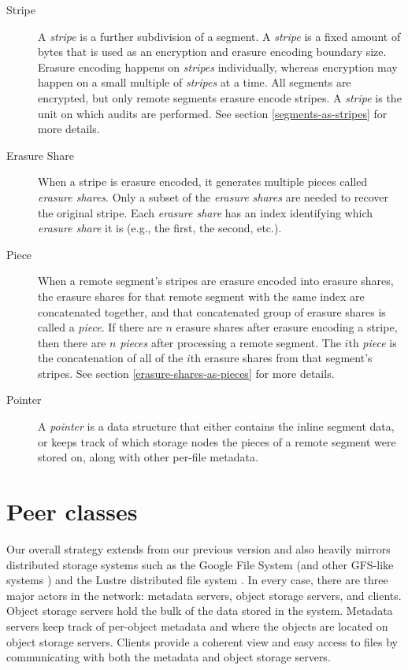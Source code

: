 \documentclass[8pt,fleqn,openany]{book}
\begin{document}
\begin{description}
\item[Stripe] A {\em stripe} is a further subdivision of a segment. A
{\em stripe} is a fixed amount of bytes that is used as an encryption and erasure
encoding boundary size. Erasure encoding happens on {\em stripes} individually,
whereas encryption may happen on a small multiple of {\em stripes} at a time.
All segments are encrypted, but only remote segments erasure encode stripes.
A {\em stripe} is the unit on which audits are performed.
See section \ref{segments-as-stripes} for more details.

\item[Erasure Share] When a stripe is erasure encoded, it generates
multiple pieces called {\em erasure shares}. Only a subset of the {\em erasure
shares} are needed to recover the original stripe. Each {\em erasure
share} has an index identifying which {\em erasure share} it is (e.g., the first,
the second, etc.).

\item[Piece] When a remote segment's stripes are erasure encoded into
erasure shares, the erasure shares for that remote segment with the
same index are concatenated together, and that concatenated group of erasure
shares is called a {\em piece}. If there are $n$ erasure shares after erasure
encoding a stripe, then there are $n$ {\em pieces} after processing a remote
segment. The $i$th {\em piece} is the concatenation of all of the $i$th
erasure shares from that segment's stripes.
See section \ref{erasure-shares-as-pieces} for more details.

\item[Pointer] A {\em pointer} is a data structure that either contains the
inline segment data, or keeps track of which
storage nodes the pieces of a remote segment were stored on, along with other
per-file metadata.

\end{description}

\section{Peer classes}

Our overall strategy extends from our previous version \cite{storj-v2} and
also heavily mirrors distributed storage systems such as the Google File System
\cite{gfs} (and other GFS-like systems \cite{hdfs, qfs, hopsfs}) and the
Lustre distributed file system \cite{lustre}. In every case,
there are three major actors in the network:
metadata servers, object storage servers, and clients. Object
storage servers hold the bulk of the data stored in the system. Metadata
servers keep track of per-object metadata and where the objects are located
on object storage servers. Clients provide a coherent view and easy access
to files by communicating with both the metadata and object storage servers.
\end{document}
